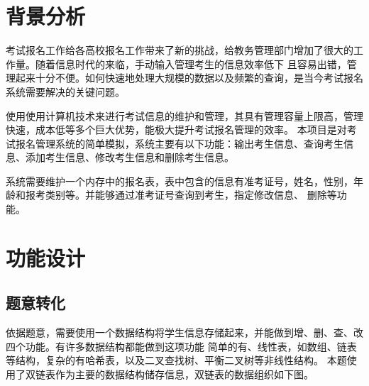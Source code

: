 
\chapter{背景分析}

考试报名工作给各高校报名工作带来了新的挑战，给教务管理部门增加了很大的工作量。随着信息时代的来临，手动输入管理考生的信息效率低下%
且容易出错，管理起来十分不便。如何快速地处理大规模的数据以及频繁的查询，是当今考试报名系统需要解决的关键问题。

使用使用计算机技术来进行考试信息的维护和管理，其具有管理容量上限高，管理快速，成本低等多个巨大优势，能极大提升考试报名管理的效率。%
本项目是对考试报名管理系统的简单模拟，系统主要有以下功能：输出考生信息、查询考生信息、添加考生信息、修改考生信息和删除考生信息。

系统需要维护一个内存中的报名表，表中包含的信息有准考证号，姓名，性别，年龄和报考类别等。并能够通过准考证号查询到考生，指定修改信息、%
删除等功能。




\chapter{功能设计}

\section{题意转化}
依据题意，需要使用一个数据结构将学生信息存储起来，并能做到{\kaishu 增、删、查、改}四个功能。有许多数据结构都能做到这项功能%
简单的有、{\kaishu 线性表}，如数组、链表等结构，复杂的有哈希表，以及二叉查找树、平衡二叉树等非线性结构。%
本题使用了{\kaishu 双链表}作为主要的数据结构储存信息，双链表的数据组织如下图。

\newcommand{\data}{
      data \nodepart{second}
      \phantom{\texttt{NULL}}
    }

